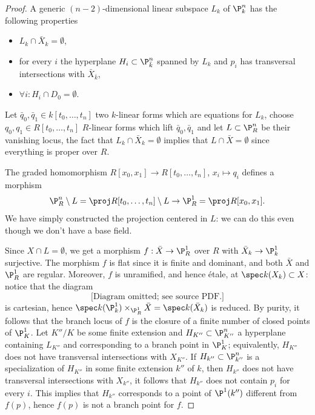 \begin{lemma}
\begin{proof}
		A generic $(n-2)$-dimensional linear subspace $L_{k}$ of $\P^{n}_{k}$ has the following properties
		\begin{itemize}
			\item $L_{k}\cap \bar{X}_{k}=\emptyset$,
			\item for every $i$ the hyperplane $H_{i}\subset\P^{n}_{\bar{k}}$ spanned by $L_{k}$ and $p_{i}$ has transversal intersections with $\bar{X}_{\bar{k}}$,
			\item $\forall i:H_{i}\cap D_{0}=\emptyset$.
		\end{itemize}

		Let $\bar{q}_{0},\bar{q}_{1}\in k[t_{0},\dots,t_{n}]$ two $k$-linear forms which are equations for $L_{k}$, choose $q_{0},q_{1}\in R[t_{0},\dots,t_{n}]$ $R$-linear forms which lift $\bar{q}_{0},\bar{q}_{1}$ and let $L\subset\P^{n}_{R}$ be their vanishing locus, the fact that $L_{k}\cap \bar{X}_{k}=\emptyset$ implies that $L\cap \bar{X}=\emptyset$ since everything is proper over $R$.

		The graded homomorphism $R[x_{0},x_{1}]\to R[t_{0},\dots,t_{n}]$, $x_{i}\mapsto q_{i}$ defines a morphism
		\[\P^{n}_{R}\setminus L=\proj R[t_{0},\dots,t_{n}]\setminus L\to\P^{1}_{R}=\proj R[x_{0},x_{1}].\]
		We have simply constructed the projection centered in $L$: we can do this even though we don't have a base field.

		Since $X\cap L=\emptyset$, we get a morphism $f:\bar{X}\to\P^{1}_{R}$ over $R$ with $\bar{X}_{k}\to\P^{1}_{k}$ surjective. The morphism $f$ is flat since it is finite and dominant, and both $\bar{X}$ and $\P^{1}_{R}$ are regular. Moreover, $f$ is unramified, and hence étale, at $\spec k(X_{k})\subset X$: notice that the diagram
		\[\text{[Diagram omitted; see source PDF.]}\]
		is cartesian, hence $\spec k(\P^{1}_{k})\times_{\P^{1}_{R}}\bar{X}=\spec k(\bar{X}_{k})$ is reduced. By purity, it follows that the branch locus of $f$ is the closure of a finite number of closed points of $\P^{1}_{K}$. Let $K''/K$ be some finite extension and $H_{K''}\subset \P^{n}_{K''}$ a hyperplane containing $L_{K''}$ and corresponding to a branch point in $\P^{1}_{K}$; equivalently, $H_{K''}$ does not have transversal intersections with $X_{K''}$. If $H_{k''}\subset \P^{n}_{k''}$ is a specialization of $H_{K''}$ in some finite extension $k''$ of $k$, then $H_{k''}$ does not have transversal intersections with $X_{k''}$, it follows that $H_{k''}$ does not contain $p_{i}$ for every $i$. This implies that $H_{k''}$ corresponds to a point of $\P^{1}(k'')$ different from $f(p)$, hence $f(p)$ is not a branch point for $f$.


\end{proof}
\end{lemma}
